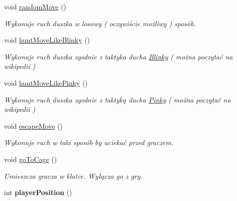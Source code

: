\begin{DoxyCompactItemize}
\mbox{\label{classGhost_a3b81cc4834e50754a0de2343ec6f0aae}} 
void \hyperlink{classGhost_a3b81cc4834e50754a0de2343ec6f0aae}{random\+Move} ()
\begin{DoxyCompactList}\small\item\em Wykonuje ruch duszka w losowy ( oczywiście możliwy ) sposób. \end{DoxyCompactList}\item 
\mbox{\label{classGhost_a07c89e08fa1fa5ec574cbc846eb839dc}} 
void \hyperlink{classGhost_a07c89e08fa1fa5ec574cbc846eb839dc}{hunt\+Move\+Like\+Blinky} ()
\begin{DoxyCompactList}\small\item\em Wykonuje ruch duszka zgodnie z taktyka ducha \hyperlink{classBlinky}{Blinky} ( można poczytać na wikipedii ) \end{DoxyCompactList}\item 
\mbox{\label{classGhost_a38cc82d7c1c5f1db32d68bbebff8137d}} 
void \hyperlink{classGhost_a38cc82d7c1c5f1db32d68bbebff8137d}{hunt\+Move\+Like\+Pinky} ()
\begin{DoxyCompactList}\small\item\em Wykonuje ruch duszka zgodnie z taktyką ducha \hyperlink{classPinky}{Pinky} ( moźna poczytać na wikipedii ) \end{DoxyCompactList}\item 
\mbox{\label{classGhost_a3417f9bbc23adc0ad0ff0db7e62580a2}} 
void \hyperlink{classGhost_a3417f9bbc23adc0ad0ff0db7e62580a2}{escape\+Move} ()
\begin{DoxyCompactList}\small\item\em Wykonuje ruch w taki sposób by uciekać przed graczem. \end{DoxyCompactList}\item 
\mbox{\label{classGhost_aeac8841dffd0f8c1c21669b43c710008}} 
void \hyperlink{classGhost_aeac8841dffd0f8c1c21669b43c710008}{go\+To\+Cage} ()
\begin{DoxyCompactList}\small\item\em Umieszcza gracza w klatce. Wyłącza go z gry. \end{DoxyCompactList}\item 
\mbox{\label{classGhost_a14cf85337a797013fd73f506950a8853}} 
int {\bfseries player\+Position} ()
\end{DoxyCompactItemize}

